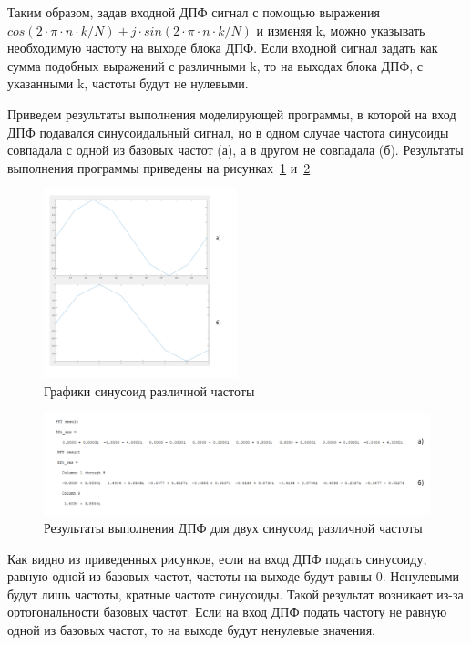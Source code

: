 Таким образом, задав входной ДПФ сигнал с помощью выражения \(cos(2 \cdot \pi \cdot n \cdot k / N) + j \cdot sin(2 \cdot \pi \cdot n \cdot k / N) \) и изменяя k, можно указывать необходимую частоту на
выходе блока ДПФ. Если входной сигнал задать как сумма подобных выражений с различными k, то на выходах
блока ДПФ, с указанными k, частоты будут не нулевыми.

Приведем результаты выполнения моделирующей программы, в которой на вход ДПФ подавался синусоидальный
сигнал, но в одном случае частота синусоиды совпадала с одной из базовых частот (а), а в другом
не совпадала (б). Результаты выполнения программы приведены на рисунках~\ref{fig:vol_dft_result_plots}
и~\ref{fig:vol_dft_result_sinc_unsinc}

\begin{figure}[H]
    \centering
    \includegraphics[width=0.5\textwidth]{img/vol_dft_result_plots}
    \caption{Графики синусоид различной частоты}
    \label{fig:vol_dft_result_plots}
\end{figure}
\begin{figure}[H]
    \centering
    \includegraphics[width=1\textwidth]{img/vol_dft_result_sinc_unsinc}
    \caption{Результаты выполнения ДПФ для двух синусоид различной частоты}
    \label{fig:vol_dft_result_sinc_unsinc}
\end{figure}

Как видно из приведенных рисунков, если на вход ДПФ подать синусоиду, равную одной из базовых
частот, частоты на выходе будут равны 0. Ненулевыми будут лишь частоты, кратные частоте синусоиды.
Такой результат возникает из-за ортогональности базовых частот. Если на вход ДПФ подать частоту не
равную одной из базовых частот, то на выходе будут ненулевые значения.

